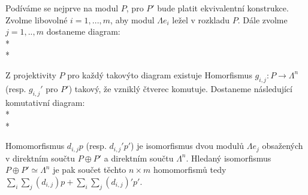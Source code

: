 \documentclass[7pt]{article}
\begin{document}
         Podíváme se nejprve na modul $P$, pro $P'$ bude platit ekvivalentní konstrukce. 
         Zvolme libovolné $i=1,...,m$, aby modul $\Lambda e_i$ ležel v rozkladu $P$. 
         Dále zvolme $j=1,..,m$ dostaneme diagram: \\*\\*
         \centerline{}   
          Z projektivity $P$  pro každý takovýto diagram existuje Homorfismus    
          $g_{i,j}:P \rightarrow \Lambda^n$ (resp. $g_{i,j}'$ pro $P'$) 
          takový, že vzniklý čtverec komutuje. Dostaneme následující 
          komutativní diagram: \\*\\*
         \centerline{}  
          Homomorfismus  $d_{i,j}p$ (resp. $d_{i,j}'p'$) je isomorfismus dvou 
          modulů $\Lambda e_j$ obsažených v direktním součtu $P \oplus P'$ 
          a direktním součtu $\Lambda^n$. Hledaný isomorfismus $P\oplus P'\simeq\Lambda^n$ 
          je pak součet těchto $n\times m$ homomorfismů tedy 
          $\sum_i\sum_j(d_{i,j})p+\sum_i\sum_j(d_{i,j})'p'$.
                      
\end{document}
